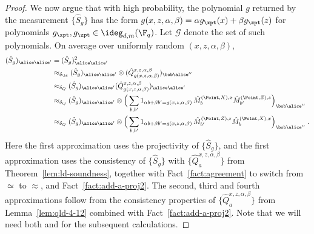 \begin{proof}
	We now argue that with high probability, the polynomial $g$ returned by the measurement $\{\hat{S}_g \}$ has the form $g(x,z,\alpha,\beta) = \alpha g_\xpt(x) + \beta g_\zpt (z)$ for polynomials $g_\xpt, g_\zpt \in \ideg_{d,m}(\F_q)$. Let $\mathcal{G}$ denote the set of such polynomials. On average over uniformly random $(x,z,\alpha,\beta)$, 
	\begin{align}
          (\hat{S}_g)_{\alice \alice'} &= (\hat{S}_g)^2_{\alice \alice'} \notag \\
                                       &\approx_{\delta_\ld} (\hat{S}_g)_{\alice \alice'} \otimes (\hat{Q}^{x,z,\alpha,\beta}_{g(x,z,\alpha,\beta)})_{\bob \alice''}\notag\\
		&\approx_{\delta_Q} (\hat{S}_g)_{\alice \alice'} (\hat{Q}^{x,z,\alpha,\beta}_{g(x,z,\alpha,\beta)})_{\alice \alice'}\notag \\
		&\approx_{\delta_Q} (\hat{S}_g)_{\alice \alice'} \otimes \Big ( \sum_{b,b'} 1_{\alpha b + \beta b' = g(x,z,\alpha,\beta)} \, \hat{M}^{(\Point,X),x}_{b} \hat{M}^{(\Point,Z),z}_{b'} \Big)_{\bob \alice''} \label{eq:qld-g-42} \\
		&\approx_{\delta_Q} (\hat{S}_g)_{\alice \alice'} \otimes \Big ( \sum_{b,b'} 1_{\alpha b + \beta b' = g(x,z,\alpha,\beta)} \, \hat{M}^{(\Point,Z),z}_{b'} \hat{M}^{(\Point,X),x}_{b} \Big)_{\bob \alice''} \;.\label{eq:qld-g-43} 		
	\end{align}
	 Here the first approximation uses the projectivity of $\{\hat{S}_g\}$, and the first approximation uses the consistency of $\{\hat{S}_g\}$ with  $\{\hat{Q}^{x,z,\alpha,\beta}_a\}$ from Theorem~\ref{lem:ld-soundness}, together with Fact~\ref{fact:agreement} to switch from $\simeq$ to $\approx$, and Fact~\ref{fact:add-a-proj2}. The second, third and fourth approximations follow from the consistency properties of $\{\hat{Q}^{x,z,\alpha,\beta}_a\}$ from Lemma~\ref{lem:qld-4-12} combined with Fact~\ref{fact:add-a-proj2}. Note that we will need both  and  for the subsequent calculations.
	

\end{proof}
